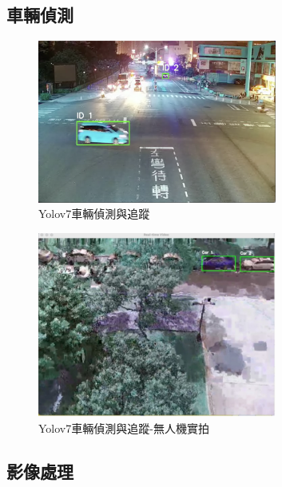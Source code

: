 \documentclass[12pt]{article}       %
\begin{document}
\subsection{車輛偵測}
\hspace{2em}
\begin{figure}[H]
    \centering
    \includegraphics[width=0.7\textwidth]{yoloreal2.png}     %
    \caption{Yolov7車輛偵測與追蹤}    %
    \label{fig:yoloreal}    %
\end{figure}
\begin{figure}[H]
    \centering
    \includegraphics[width=0.7\textwidth]{yoloreal1.jpg}     %
    \caption{Yolov7車輛偵測與追蹤-無人機實拍}    %
    \label{fig:yoloreal1}    %
\end{figure}

\subsection{影像處理}
\hspace{2em}
\end{document}
